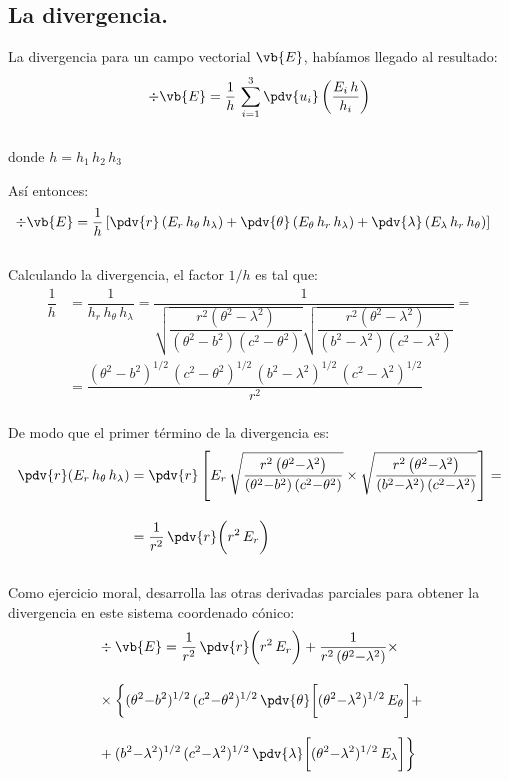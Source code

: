\subsection*{La divergencia.}

La divergencia para un campo vectorial $\vb{E}$, habíamos llegado al resultado:
\begin{align*}
\div{\vb{E}} = \dfrac{1}{h} \, \sum_{i=1}^{3} \pdv{u_{i}} \left( \dfrac{E_{i} \, h}{h_{i}} \right)
\end{align*}
\\
donde $h = h_{1} \, h_{2} \, h_{3}$

Así entonces:
\begin{align*}
\div{\vb{E}} &= \dfrac{1}{h} \left[ \pdv{r} \left( E_{r} \, h_{\theta} \, h_{\lambda} \right) + \pdv{\theta} \left( E_{\theta} \, h_{r} \, h_{\lambda} \right) + \pdv{\lambda} \left( E_{\lambda} \, h_{r} \, h_{\theta} \right) \right]
\end{align*}
\\
Calculando la divergencia, el factor $1/h$ es tal que:
\begin{align*}
\dfrac{1}{h} &= \dfrac{1}{ h_{r} \, h_{\theta} \, h_{\lambda}} = \dfrac{1}{\sqrt{\dfrac{r^2 \left(\theta ^2-\lambda ^2\right)}{\left(\theta ^2-b^2\right) \left(c^2-\theta ^2\right)}} \sqrt{\dfrac{r^2 \left(\theta ^2-\lambda ^2\right)}{\left(b^2-\lambda ^2\right) \left(c^2-\lambda ^2\right)}}} = \\[1em]
&= \dfrac{(\theta^{2} {-} b^{2})^{1/2} \, (c^{2} {-} \theta^{2})^{1/2} \, (b^{2} {-} \lambda^{2})^{1/2} \, (c^{2} {-} \lambda^{2})^{1/2}}{r^{2}} 
\end{align*}
\\
De modo que el primer término de la divergencia es:
\begin{align*}
\pdv{r} (E_{r} \, h_{\theta} \, h_{\lambda}) &= \pdv{r} \left[ E_{r} \, \sqrt{\dfrac{r^{2} \left(\theta^{2}{-} \lambda^{2}\right)}{\left(\theta^{2} {-} b^{2}\right) \left(c^{2} {-} \theta^{2}\right)}} \times \sqrt{\dfrac{r^{2} \left(\theta^{2} {-} \lambda^{2}\right)}{\left(b^{2} {-} \lambda^{2}\right) \left(c^{2} {-} \lambda^{2}\right)}} \right] = \\[1em] 
&= \dfrac{1}{r^{2}} \, \pdv{r} \bigg( r^{2} \, E_{r} \bigg)
\end{align*}
\\
Como ejercicio moral, desarrolla las otras derivadas parciales para obtener la divergencia en este sistema coordenado cónico:
\begin{align*}
&\div{\vb{E}} = \dfrac{1}{r^{2}} \, \pdv{r} \bigg( r^{2} \, E_{r} \bigg) + \dfrac{1}{r^{2} \, (\theta^{2} {-} \lambda^{2})} \times \\[1em]
&\times \biggl\{ (\theta^{2} {-} b^{2})^{1/2} \, (c^{2} {-} \theta^{2})^{1/2} \, \pdv{\theta} \bigg[ (\theta^{2} {-} \lambda^{2})^{1/2} \, E_{\theta} \bigg] + \\[1em]
&+ (b^{2} {-} \lambda^{2})^{1/2} \, (c^{2} {-} \lambda^{2})^{1/2} \, \pdv{\lambda} \bigg[ (\theta^{2} {-} \lambda^{2})^{1/2} \, E_{\lambda} \bigg] \biggl\}
\end{align*}

